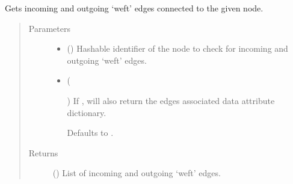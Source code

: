 \documentclass[letterpaper,10pt,english]{sphinxmanual}
\begin{document}
\begin{fulllineitems}
\begin{fulllineitems}
\label{\detokenize{cockatoo:cockatoo.KnitDiNetwork.node_weft_edges}}
Gets incoming and outgoing ‘weft’ edges connected to the given node.
\begin{quote}\begin{description}
\item[{Parameters}] \leavevmode\begin{itemize}
\item {} 
 () \textendash{} Hashable identifier of the node to check for incoming and outgoing
‘weft’ edges.

\item {} 
 (%
\begin{footnote}[152]\sphinxAtStartFootnote
{}
%
\end{footnote}\sphinxstyleliteralemphasis{\sphinxupquote{, }}) \textendash{} 
If , will also return the edges associated data attribute
dictionary.

Defaults to .


\end{itemize}

\item[{Returns}] \leavevmode
{} () \textendash{} List of incoming and outgoing ‘weft’ edges.

\end{description}\end{quote}

\end{fulllineitems}



\end{fulllineitems}
\end{document}
